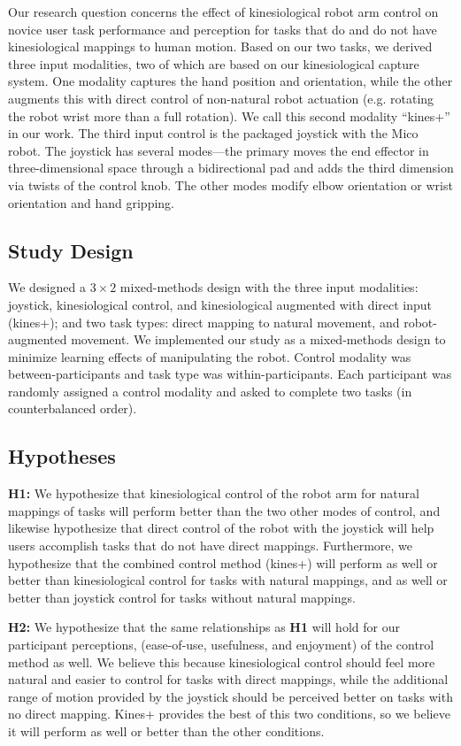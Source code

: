\documentclass{sigchi}
\begin{document}
Our research question concerns the effect of kinesiological robot arm control on novice user task performance and perception for tasks that do and do not have kinesiological mappings to human motion.  Based on our two tasks, we derived three input modalities, two of which are based on our kinesiological capture system.  One modality captures the hand position and orientation, while the other augments this with direct control of non-natural robot actuation (e.g. rotating the robot wrist more than a full rotation).  We call this second modality ``kines+'' in our work. The third input control is the packaged joystick with the Mico robot.  The joystick has several modes---the primary moves the end effector in three-dimensional space through a bidirectional pad and adds the third dimension via twists of the control knob.  The other modes modify elbow orientation or wrist orientation and hand gripping.  

\subsection{Study Design}

We designed a $3\times2$ mixed-methods design with the three input modalities: joystick, kinesiological control, and kinesiological augmented with direct input (kines+); and two task types: direct mapping to natural movement, and robot-augmented movement.  We implemented our study as a mixed-methods design to minimize learning effects of manipulating the robot. Control modality was between-participants and task type was within-participants. Each participant was randomly assigned a control modality and asked to complete two tasks (in counterbalanced order).

\subsection{Hypotheses}

\textbf{H1:} We hypothesize that kinesiological control of the robot arm for natural mappings of tasks will perform better than the two other modes of control, and likewise hypothesize that direct control of the robot with the joystick will help users accomplish tasks that do not have direct mappings. Furthermore, we hypothesize that the combined control method (kines+) will perform as well or better than kinesiological control for tasks with natural mappings, and as well or better than joystick control for tasks without natural mappings.

\textbf{H2:} We hypothesize that the same relationships as \textbf{H1} will hold for our participant perceptions, (ease-of-use, usefulness, and enjoyment) of the control method as well. We believe this because kinesiological control should feel more natural and easier to control for tasks with direct mappings, while the additional range of motion provided by the joystick should be perceived better on tasks with no direct mapping. Kines+ provides the best of this two conditions, so we believe it will perform as well or better than the other conditions.
\end{document}
